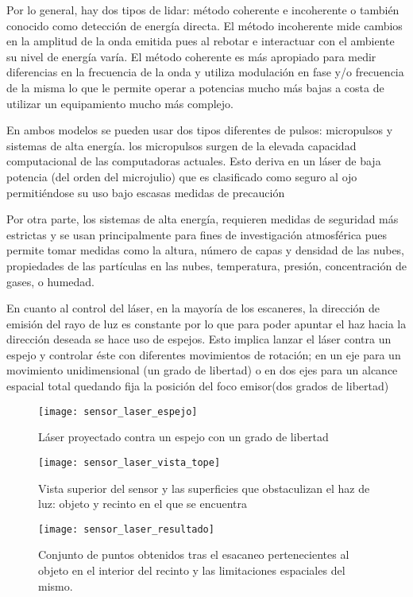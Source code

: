 Por lo general, hay dos tipos de lidar:
método coherente e incoherente o también conocido como detección de energía directa.
El método incoherente mide cambios en la amplitud de la onda emitida pues al rebotar e interactuar con el ambiente su nivel de energía varía.
El método coherente es más apropiado para medir diferencias en la frecuencia de la onda y utiliza modulación en fase y/o frecuencia de la misma lo que le permite operar a potencias mucho más bajas a costa de utilizar un equipamiento mucho más complejo.


En ambos modelos se pueden usar dos tipos diferentes de pulsos: micropulsos y sistemas de alta energía.
los micropulsos surgen de la elevada capacidad computacional de las computadoras actuales. Esto deriva en un láser de baja potencia (del orden del microjulio) que es clasificado como seguro al ojo permitiéndose su uso bajo escasas medidas de precaución 

Por otra parte, los sistemas de alta energía, requieren medidas de seguridad más estrictas y se usan principalmente para fines de investigación atmosférica pues permite tomar medidas como la altura, número de capas y densidad de las nubes, propiedades de las partículas en las nubes, temperatura, presión, concentración de gases, o humedad.

En cuanto al control del láser, en la mayoría de los escaneres, la dirección de emisión del rayo de luz es constante por lo que para poder apuntar el haz hacia la dirección deseada se hace uso de espejos. Esto implica lanzar el láser contra un espejo y controlar éste con diferentes movimientos de rotación; en un eje para un movimiento unidimensional (un grado de libertad) o en dos ejes para un alcance espacial total quedando fija la posición del foco emisor(dos grados de libertad)

\begin{figure}[!htb]
  \texttt{[image: sensor\_laser\_espejo]}
  \caption{Láser proyectado contra un espejo con un grado de libertad}\label{fig:sensor laser completo - espejo}
\endminipage\hfill
{}
  \texttt{[image: sensor\_laser\_vista\_tope]}
  \caption{Vista superior del sensor y las superficies que obstaculizan el haz de luz: objeto y recinto en el que se encuentra}\label{fig:sensor laser completo - vista tope}
\endminipage\hfill
{}
  \texttt{[image: sensor\_laser\_resultado]}
  \caption{Conjunto de puntos obtenidos tras el esacaneo pertenecientes al objeto en el interior del recinto y las limitaciones espaciales del mismo.}\label{fig:sensor laser completo - resultado}
\endminipage
\end{figure}

